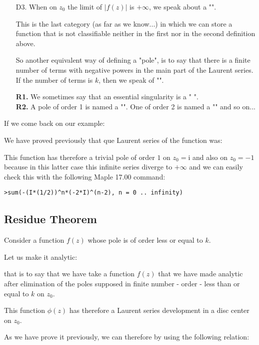 \begin{enumerate}
		\item[D3.] When on $z_0$ the limit of $\vert f(z) \vert$ is $+\infty$, we speak about a "".
		
		This is the last category (as far as we know...) in which we can store a function that is not classifiable neither in the first nor in the second definition above.
		
		So another equivalent way of defining a "pole", is to say that there is a finite number of terms with negative powers in the main part of the Laurent series. If the number of terms is $k$, then we speak of "".
		
	\begin{tcolorbox}[title=Remarks,colframe=black,arc=10pt]
	\textbf{R1.} We sometimes say that an essential singularity is a " ".\\
	
	\textbf{R2.} A pole of order 1 is named a "". One of order 2 is named a "" and so on...
	\end{tcolorbox}
	\end{enumerate}
	If we come back on our example:
	
	We have proved previously that que Laurent series of the function was:
	
	This function has therefore a trivial pole of order $1$ on $z_0=\mathrm{i}$ and also on $z_0=-1$ because in this latter case this infinite series diverge to $+\infty$ and we can easily check this with the following Maple 17.00 command:
	
	\texttt{>sum(-(I*(1/2))\string^n*(-2*I)\string^(n-2), n = 0 .. infinity)}
	
	\subsection{Residue Theorem}
	Consider a function $f(z)$ whose pole is of order less or equal to $k$.
	
	Let us make it  analytic:
	
	that is to say that we have take a function $f(z)$ that we have made analytic after elimination of the poles supposed in finite number - order - less than or equal to $k$ on $z_0$. 
	
	This function $\phi(z)$ has therefore a Laurent series development  in a disc center on $z_0$.
	
	As we have prove it previously, we can therefore by using the following relation:
	
